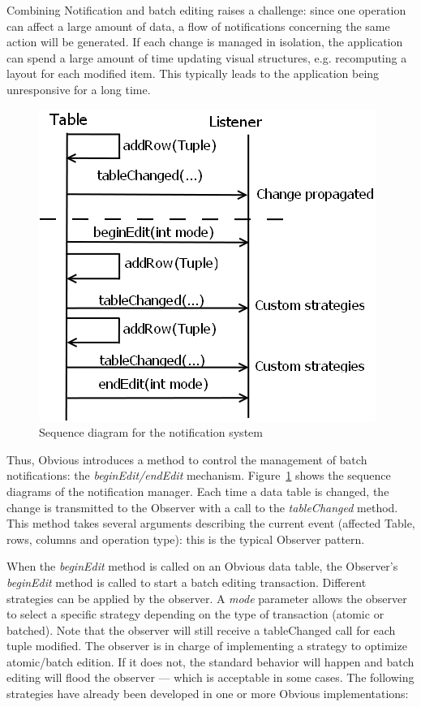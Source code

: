 \label{sub:combiningnotif}

Combining Notification and batch editing raises a challenge: since one
operation can affect a large amount of data, a flow of notifications
concerning the same action will be generated.  If each change is
managed in isolation, the application can spend a large amount of time
updating visual structures, e.g. recomputing a layout for each
modified item.  This typically leads to the application being
unresponsive for a long time.

\begin{figure}[!ht]
  \centering
  \includegraphics[width=.7\columnwidth]{figures/notification}
  \caption{Sequence diagram for the notification system}
  \label{fig:notification}
\end{figure}

Thus, Obvious introduces a method to control the management of batch
notifications: the \emph{beginEdit/endEdit} mechanism.
Figure~\ref{fig:notification} shows the sequence diagrams of the
notification manager.  Each time a data table is changed, the change
is transmitted to the Observer with a call to the \emph{tableChanged}
method.  This method takes several arguments describing the current
event (affected Table, rows, columns and operation type): this is the
typical Observer pattern.

When the \emph{beginEdit} method is called on an Obvious data table,
the Observer's \emph{beginEdit} method is called to start a batch
editing transaction.  Different strategies can be applied by the
observer.  A \emph{mode} parameter allows the observer to select a
specific strategy depending on the type of transaction (atomic or
batched).  Note that the observer will still receive a tableChanged
call for each tuple modified.  The observer is in charge of
implementing a strategy to optimize atomic/batch edition.  If it does
not, the standard behavior will happen and batch editing will flood
the observer --- which is acceptable in some cases.  The following
strategies have already been developed in one or more Obvious
implementations:

